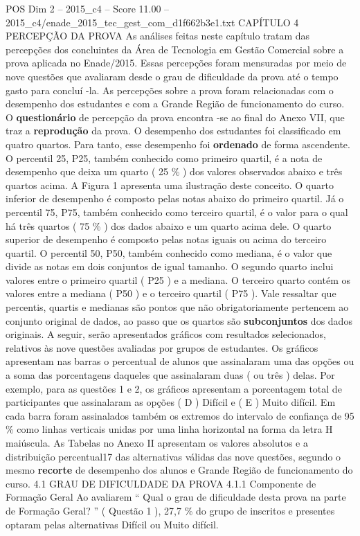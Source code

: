 \begin{textsample}{POS Dim 2 – 2015\_c4 – Score 11.00 – 2015\_c4/enade\_2015\_tec\_gest\_com\_d1f662b3e1.txt}  \label{ex:f2_pos_086}
CAPÍTULO 4 PERCEPÇÃO DA PROVA As análises feitas neste capítulo tratam das percepções dos concluintes da Área de Tecnologia em Gestão Comercial sobre a prova aplicada no Enade/2015.
Essas percepções foram mensuradas por meio de nove questões que avaliaram desde o grau de dificuldade da prova até o tempo gasto para concluí -la.
As percepções sobre a prova foram relacionadas com o desempenho dos estudantes e com a Grande Região de funcionamento do curso.
O \textbf{questionário} de percepção da prova encontra -se ao final do Anexo VII, que traz a \textbf{reprodução} da prova.
O desempenho dos estudantes foi classificado em quatro quartos.
Para tanto, esse desempenho foi \textbf{ordenado} de forma ascendente.
O percentil 25, P25, também conhecido como primeiro quartil, é a nota de desempenho que deixa um quarto ( 25 \% ) dos valores observados abaixo e três quartos acima.
A Figura 1 apresenta uma ilustração deste conceito.
O quarto inferior de desempenho é composto pelas notas abaixo do primeiro quartil.
Já o percentil 75, P75, também conhecido como terceiro quartil, é o valor para o qual há três quartos ( 75 \% ) dos dados abaixo e um quarto acima dele.
O quarto superior de desempenho é composto pelas notas iguais ou acima do terceiro quartil.
O percentil 50, P50, também conhecido como mediana, é o valor que divide as notas em dois conjuntos de igual tamanho.
O segundo quarto inclui valores entre o primeiro quartil ( P25 ) e a mediana.
O terceiro quarto contém os valores entre a mediana ( P50 ) e o terceiro quartil ( P75 ).
Vale ressaltar que percentis, quartis e medianas são pontos que não obrigatoriamente pertencem ao conjunto original de dados, ao passo que os quartos são \textbf{subconjuntos} dos dados originais.
A seguir, serão apresentados gráficos com resultados selecionados, relativos às nove questões avaliadas por grupos de estudantes.
Os gráficos apresentam nas barras o percentual de alunos que assinalaram uma das opções ou a soma das porcentagens daqueles que assinalaram duas ( ou três ) delas.
Por exemplo, para as questões 1 e 2, os gráficos apresentam a porcentagem total de participantes que assinalaram as opções ( D ) Difícil e ( E ) Muito difícil.
Em cada barra foram assinalados também os extremos do intervalo de confiança de 95 \% como linhas verticais unidas por uma linha horizontal na forma da letra H maiúscula.
As Tabelas no Anexo II apresentam os valores absolutos e a distribuição percentual17 das alternativas válidas das nove questões, segundo o mesmo \textbf{recorte} de desempenho dos alunos e Grande Região de funcionamento do curso. 4.1 GRAU DE DIFICULDADE DA PROVA 4.1.1 Componente de Formação Geral Ao avaliarem “ Qual o grau de dificuldade desta prova na parte de Formação Geral? ” ( Questão 1 ), 27,7 \% do grupo de inscritos e presentes optaram pelas alternativas Difícil ou Muito difícil.

\end{textsample}
